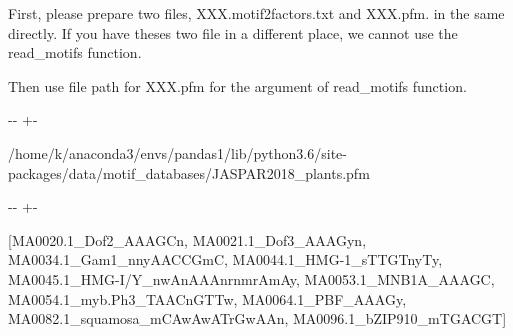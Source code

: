 \documentclass[letterpaper,10pt,english]{sphinxmanual}
\newlength\nbsphinxcodecellspacing
\begin{document}
First, please prepare two files, XXX.motif2factors.txt and XXX.pfm. in the same directly. If you have theses two file in a different place, we cannot use the read\_motifs function.

Then use file path for XXX.pfm for the argument of read\_motifs function.

{
\begin{sphinxVerbatim}[commandchars=\\\{\}]
\llap{\color{nbsphinxin}[58]:\,\hspace{\fboxrule}\hspace{\fboxsep}}   


  

\PYG{p}{[}\PYG{p}{]}
\end{sphinxVerbatim}
}

{

\kern-\sphinxverbatimsmallskipamount\kern-\baselineskip
\kern+\FrameHeightAdjust\kern-\fboxrule
\vspace{\nbsphinxcodecellspacing}

\begin{sphinxVerbatim}[commandchars=\\\{\}]
/home/k/anaconda3/envs/pandas1/lib/python3.6/site-packages/data/motif\_databases/JASPAR2018\_plants.pfm
\end{sphinxVerbatim}
}

{

\kern-\sphinxverbatimsmallskipamount\kern-\baselineskip
\kern+\FrameHeightAdjust\kern-\fboxrule
\vspace{\nbsphinxcodecellspacing}

\begin{sphinxVerbatim}[commandchars=\\\{\}]
\llap{\color{nbsphinxout}[58]:\,\hspace{\fboxrule}\hspace{\fboxsep}}[MA0020.1\_Dof2\_AAAGCn,
 MA0021.1\_Dof3\_AAAGyn,
 MA0034.1\_Gam1\_nnyAACCGmC,
 MA0044.1\_HMG-1\_sTTGTnyTy,
 MA0045.1\_HMG-I/Y\_nwAnAAAnrnmrAmAy,
 MA0053.1\_MNB1A\_AAAGC,
 MA0054.1\_myb.Ph3\_TAACnGTTw,
 MA0064.1\_PBF\_AAAGy,
 MA0082.1\_squamosa\_mCAwAwATrGwAAn,
 MA0096.1\_bZIP910\_mTGACGT]
\end{sphinxVerbatim}
}
\end{document}
